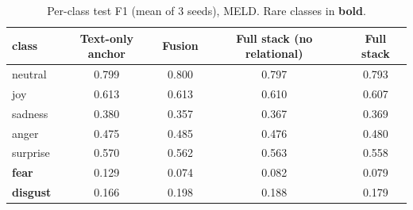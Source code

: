 \begin{table}[t]
\centering
\caption{Per-class test F1 (mean of 3 seeds), MELD. Rare classes in \textbf{bold}.}
\label{tab:per-class-meld}
\begin{tabular}{lcccc}
\toprule
class & Text-only anchor & Fusion & Full stack (no relational) & Full stack \\
\midrule
neutral & 0.799 & 0.800 & 0.797 & 0.793 \\
joy & 0.613 & 0.613 & 0.610 & 0.607 \\
sadness & 0.380 & 0.357 & 0.367 & 0.369 \\
anger & 0.475 & 0.485 & 0.476 & 0.480 \\
surprise & 0.570 & 0.562 & 0.563 & 0.558 \\
\textbf{fear} & 0.129 & 0.074 & 0.082 & 0.079 \\
\textbf{disgust} & 0.166 & 0.198 & 0.188 & 0.179 \\
\bottomrule
\end{tabular}
\end{table}
